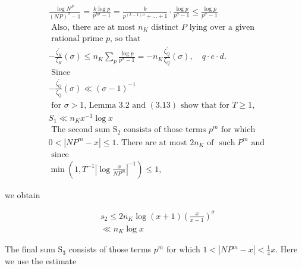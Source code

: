 $$
\begin{aligned}
& \frac{\log N^{P}}{(N P)^{\sigma}-1}=\frac{k \log p}{p^{k \sigma}-1}=\frac{k}{p^{(k-1) \sigma}+\ldots+1} \cdot \frac{\log p}{p^{\sigma}-1} \leqslant \frac{\log p}{p^{\sigma}-1} \\
& \text { Also, there are at most } n_{K} \text { distinct } P \text { lying over a given } \\
& \text { rational prime } p \text {, so that } \\
& -\frac{\zeta_{K}^{\prime}}{\zeta_{K}}(\sigma) \leqslant n_{K} \sum_{p} \frac{\log p}{p^{\sigma}-1}=-n_{K} \frac{\zeta_{Q}^{\prime}}{\zeta_{Q}}(\sigma), \quad q \cdot e \cdot d . \\
& \text { Since } \\
& -\frac{\zeta_{Q}^{\prime}}{\zeta_{Q}}(\sigma) \ll(\sigma-1)^{-1} \\
& \text { for } \sigma>1 \text {, Lemma } 3.2 \text { and }(3.13) \text { show that for } T \geqslant 1 \text {, } \\
& S_{1} \ll n_{K} x^{-1} \log x \\
& \text { The second sum } \mathrm{S}_{2} \text { consists of those terms } p^{m} \text { for which } \\
& 0<\left|N P^{m}-x\right| \leqslant 1 \text {. There are at most } 2 n_{K} \text { of } \operatorname{such} P^{m} \text { and } \\
& \text { since } \\
& \min \left(1, T^{-1}\left|\log \frac{x}{N P^{m}}\right|^{-1}\right) \leqslant 1,
\end{aligned}
$$

we obtain

$$
\begin{aligned}
& s_{2} \leqslant 2 n_{K} \log (x+1)\left(\frac{x}{x-1}\right)^{\sigma} \\
& \ll n_{K} \log x
\end{aligned}
$$

The final sum $\mathrm{S}_{3}$ consists of those terms $p^{m}$ for which $1<\left|N P^{m}-x\right|<\frac{1}{4} x$. Here we use the estimate 


